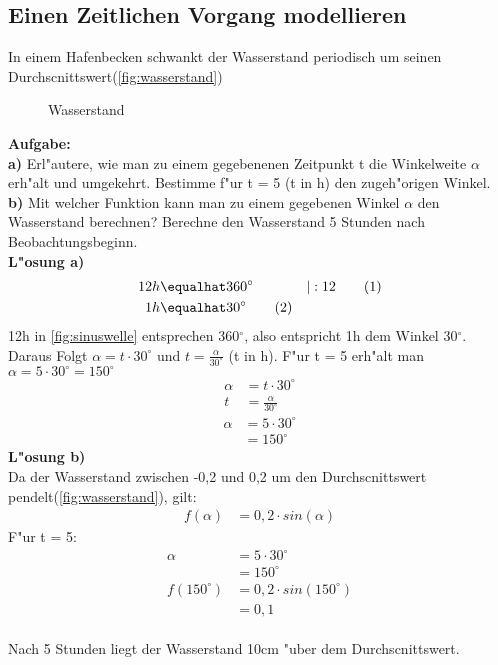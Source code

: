 \documentclass{standalone}
\begin{document}
\subsection{Einen Zeitlichen Vorgang modellieren}

\noindent In einem Hafenbecken schwankt der Wasserstand periodisch um seinen Durchscnittswert(\autoref{fig:wasserstand})

\begin{figure}[hb!]
  \center
  \def\svgwidth{500px}
  
  \caption{Wasserstand}
  \label{fig:wasserstand}
\end{figure}

\noindent \textbf{Aufgabe:}\\
\noindent \textbf{a)} Erl{"a}utere, wie man zu einem gegebenenen Zeitpunkt t die Winkelweite $\alpha$ erh{"a}lt und umgekehrt. Bestimme f{"u}r t = 5 (t in h) den zugeh{"o}rigen Winkel.\\
\noindent \textbf{b)} Mit welcher Funktion kann man zu einem gegebenen Winkel $\alpha$ den Wasserstand berechnen? Berechne den Wasserstand 5 Stunden nach Beobachtungsbeginn.\\
\noindent \textbf{L{"o}sung a)}
\begin{align}
  12h & \equalhat 360^\circ        & |:12\tag{1} \\
  1h  & \equalhat 30^\circ \tag{2}
\end{align}
\noindent 12h in {\autoref{fig:sinuswelle}} entsprechen 360$^\circ$, also entspricht 1h dem Winkel 30$^\circ$.\\
Daraus Folgt $\alpha = t \cdot 30^\circ$ und $t = \frac{\alpha}{30^\circ}$ (t in h). F{"u}r t = 5 erh{"a}lt man $\alpha = 5 \cdot 30^\circ = 150^\circ$
\begin{align}
  \alpha & = t \cdot 30^\circ     \nonumber      \\
  t      & = \frac{\alpha}{30^\circ}   \nonumber
\end{align}
\begin{align}
  \alpha & = 5 \cdot 30^\circ \tag{1} \\ & = 150^\circ \tag{2}
\end{align}
\noindent \textbf{L{"o}sung b)}\\
Da der Wasserstand zwischen -0,2 und 0,2 um den Durchscnittswert pendelt(\autoref{fig:wasserstand}), gilt:
\begin{align}
  f(\alpha) & = 0,2 \cdot sin(\alpha)     \nonumber
\end{align}
\noindent F{"u}r t = 5:
\begin{align}
  \alpha       & = 5 \cdot 30^\circ     \tag{1}     \\
               & = 150^\circ   \tag{2}              \\
  f(150^\circ) & = 0,2 \cdot sin(150^\circ) \tag{3} \\
               & = 0,1 \tag{4}
\end{align}\\
\noindent Nach 5 Stunden liegt der Wasserstand 10cm {"u}ber dem Durchscnittswert.
\end{document}

